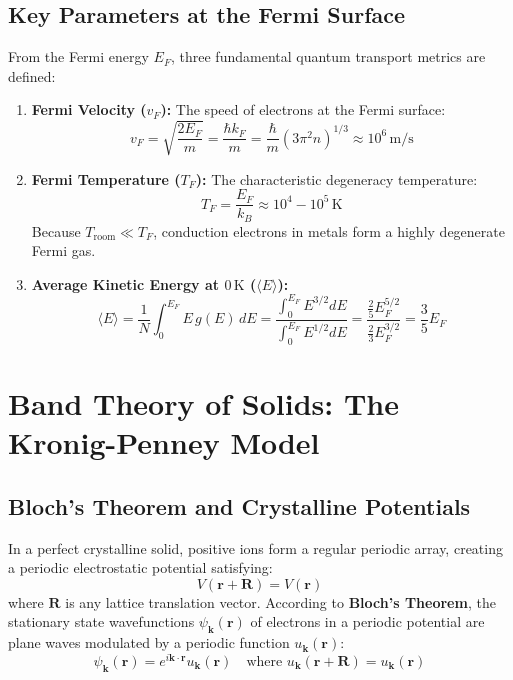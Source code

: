 \subsection{Key Parameters at the Fermi Surface}
From the Fermi energy $E_F$, three fundamental quantum transport metrics are defined:
\begin{enumerate}
    \item \textbf{Fermi Velocity ($v_F$):} The speed of electrons at the Fermi surface:
    \begin{equation}
        v_F = \sqrt{\frac{2E_F}{m}} = \frac{\hbar k_F}{m} = \frac{\hbar}{m}(3\pi^2 n)^{1/3} \approx 10^6\,\text{m/s}
    \end{equation}
    \item \textbf{Fermi Temperature ($T_F$):} The characteristic degeneracy temperature:
    \begin{equation}
        T_F = \frac{E_F}{k_B} \approx 10^4 - 10^5\,\text{K}
    \end{equation}
    Because $T_{\text{room}} \ll T_F$, conduction electrons in metals form a highly degenerate Fermi gas.
    \item \textbf{Average Kinetic Energy at $0\,\text{K}$ ($\langle E \rangle$):}
    \begin{equation}
        \langle E \rangle = \frac{1}{N}\int_0^{E_F} E\, g(E)\, dE = \frac{\int_0^{E_F} E^{3/2} dE}{\int_0^{E_F} E^{1/2} dE} = \frac{\frac{2}{5}E_F^{5/2}}{\frac{2}{3}E_F^{3/2}} = \frac{3}{5}E_F
    \end{equation}
\end{enumerate}

\section{Band Theory of Solids: The Kronig-Penney Model}
\subsection{Bloch's Theorem and Crystalline Potentials}
In a perfect crystalline solid, positive ions form a regular periodic array, creating a periodic electrostatic potential satisfying:
\begin{equation}
    V(\mathbf{r} + \mathbf{R}) = V(\mathbf{r})
\end{equation}
where $\mathbf{R}$ is any lattice translation vector. According to \textbf{Bloch's Theorem}, the stationary state wavefunctions $\psi_{\mathbf{k}}(\mathbf{r})$ of electrons in a periodic potential are plane waves modulated by a periodic function $u_{\mathbf{k}}(\mathbf{r})$:
\begin{equation}
    \psi_{\mathbf{k}}(\mathbf{r}) = e^{i \mathbf{k}\cdot\mathbf{r}} u_{\mathbf{k}}(\mathbf{r}) \quad \text{where } u_{\mathbf{k}}(\mathbf{r} + \mathbf{R}) = u_{\mathbf{k}}(\mathbf{r})
\end{equation}

